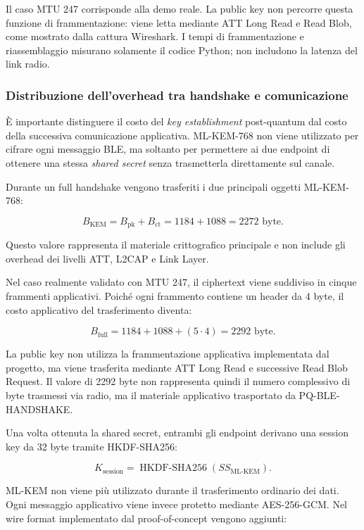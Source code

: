\documentclass[11pt,a4paper]{article}
\begin{document}
Il caso MTU 247 corrisponde alla demo reale. La public key non percorre
questa funzione di frammentazione: viene letta mediante ATT Long Read e
Read Blob, come mostrato dalla cattura Wireshark. I tempi di
frammentazione e riassemblaggio misurano solamente il codice Python; non
includono la latenza del link radio.
\subsubsection{Distribuzione dell'overhead tra handshake e comunicazione}

È importante distinguere il costo del \textit{key establishment}
post-quantum dal costo della successiva comunicazione applicativa.
ML-KEM-768 non viene utilizzato per cifrare ogni messaggio BLE, ma
soltanto per permettere ai due endpoint di ottenere una stessa
\textit{shared secret} senza trasmetterla direttamente sul canale.

Durante un full handshake vengono trasferiti i due principali oggetti
ML-KEM-768:

\[
B_{\mathrm{KEM}}
=
B_{\mathrm{pk}} + B_{\mathrm{ct}}
=
1184 + 1088
=
2272 \text{ byte}.
\]

Questo valore rappresenta il materiale crittografico principale e non
include gli overhead dei livelli ATT, L2CAP e Link Layer.

Nel caso realmente validato con MTU 247, il ciphertext viene suddiviso
in cinque frammenti applicativi. Poiché ogni frammento contiene un header
da 4 byte, il costo applicativo del trasferimento diventa:

\[
B_{\mathrm{full}}
=
1184 + 1088 + (5 \cdot 4)
=
2292 \text{ byte}.
\]

La public key non utilizza la frammentazione applicativa implementata dal
progetto, ma viene trasferita mediante ATT Long Read e successive
Read Blob Request. Il valore di 2292 byte non rappresenta quindi il
numero complessivo di byte trasmessi via radio, ma il materiale
applicativo trasportato da PQ-BLE-HANDSHAKE.

Una volta ottenuta la shared secret, entrambi gli endpoint derivano una
session key da 32 byte tramite HKDF-SHA256:

\[
K_{\mathrm{session}}
=
\operatorname{HKDF\text{-}SHA256}
\left(
SS_{\mathrm{ML\text{-}KEM}}
\right).
\]

ML-KEM non viene più utilizzato durante il trasferimento ordinario dei
dati. Ogni messaggio applicativo viene invece protetto mediante
AES-256-GCM. Nel wire format implementato dal proof-of-concept vengono
aggiunti:
\end{document}
